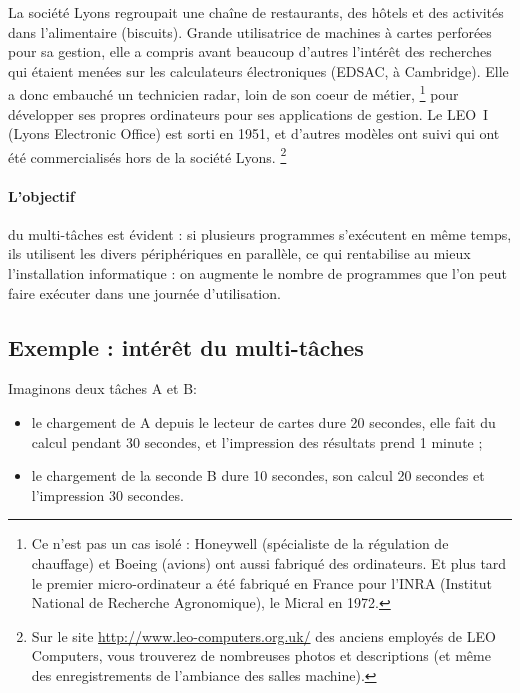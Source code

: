 \begin{multicols}{2}
\begin{itemize}
La société Lyons regroupait une chaîne de
restaurants, des hôtels et des activités dans l'alimentaire
(biscuits). Grande utilisatrice de machines à cartes perforées pour sa gestion, elle a
compris avant beaucoup d'autres l'intérêt des recherches qui étaient
menées sur les calculateurs électroniques (EDSAC, à Cambridge). Elle a
donc embauché un technicien radar, loin de son coeur de métier, 
\footnote{Ce n'est pas un cas isolé : Honeywell (spécialiste de la
  régulation de chauffage) et Boeing (avions) ont aussi fabriqué des
  ordinateurs. Et plus tard le premier micro-ordinateur a été fabriqué
  en France pour l'INRA (Institut National de Recherche Agronomique),
  le Micral en 1972.}  pour développer ses propres ordinateurs pour
ses applications de gestion. Le LEO~I (Lyons Electronic Office) est sorti en
1951, et d'autres modèles ont suivi qui ont été commercialisés hors de la société Lyons.
\footnote{
Sur le site \url{http://www.leo-computers.org.uk/} des anciens
employés de LEO Computers, vous trouverez de nombreuses photos
et descriptions (et même des enregistrements de l'ambiance des salles machine).
}
\end{itemize}

\paragraph{L'objectif} du multi-tâches est évident :  si plusieurs 
programmes s'exécutent en même temps, ils utilisent les divers
périphériques en parallèle, ce qui rentabilise au mieux l'installation
informatique : on augmente le nombre de programmes que l'on peut faire
exécuter dans une journée d'utilisation.

\end{multicols}
\subsection{Exemple : intérêt du multi-tâches}

Imaginons deux tâches A et B: 
\begin{itemize}
\item le chargement de A  depuis le lecteur de cartes dure 20 secondes, elle fait du calcul pendant 30 secondes, et l'impression des
résultats prend 1 minute ;
\item le chargement de la seconde B dure  10 secondes, son calcul 20 secondes et l'impression 30 secondes.
\end{itemize}

